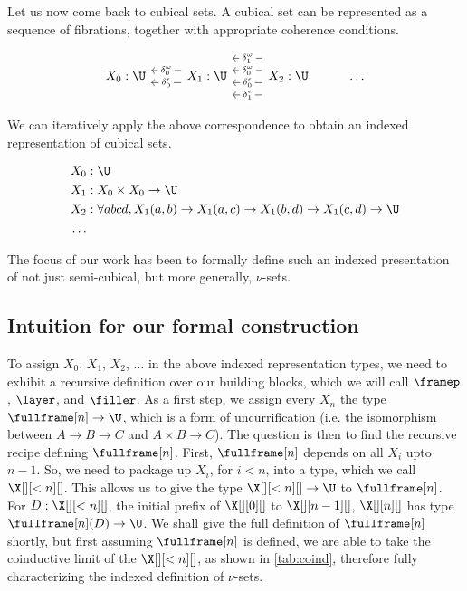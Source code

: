 \documentclass[10pt]{art.cls/art}
\begin{document}
Let us now come back to cubical sets. A cubical set can be represented as a sequence of fibrations, together with appropriate coherence conditions.

\begin{equation*}
  \begin{tikzcd}
    X_0 : \U & X_1 : \U \arrow[l, "\delta^\epsilon_0" description, shift left=2] \arrow[l, "\delta^\omega_0" description, shift right=2] & X_2 : \U \arrow[l, "\delta^\epsilon_1" description, shift left=6] \arrow[l, "\delta^\epsilon_0" description, shift left=2] \arrow[l, "\delta^\omega_0" description, shift right=2] \arrow[l, "\delta^\omega_1" description, shift right=6] & \ldots
  \end{tikzcd}
\end{equation*}

We can iteratively apply the above correspondence to obtain an indexed representation of cubical sets.

\begin{align*}
  X_0 & : \U                                                                                                              \\
  X_1 & : X_0 \times X_0 \rightarrow \U                                                                                   \\
  X_2 & : \forall a b c d, X_1 (a, b) \rightarrow X_1 (a, c) \rightarrow X_1 (b, d) \rightarrow X_1 (c, d) \rightarrow \U \\
  \ldots
\end{align*}

The focus of our work has been to formally define such an indexed presentation of not just semi-cubical, but more generally, $\nu$-sets.

\subsection{Intuition for our formal construction}
To assign $X_0$, $X_1$, $X_2$, $\ldots$ in the above indexed representation types, we need to exhibit a recursive definition over our building blocks, which we will call $\framep$, $\layer$, and $\filler$. As a first step, we assign every $X_n$ the type $\fullframe[n] \rightarrow \U$, which is a form of uncurrification (i.e. the isomorphism between $A \rightarrow B \rightarrow C$ and $A \times B \rightarrow C$). The question is then to find the recursive recipe defining $\fullframe[n]$. First, $\fullframe[n]$ depends on all $X_i$ upto $n - 1$. So, we need to package up $X_i$, for $i < n$, into a type, which we call $\X[][<n][]$. This allows us to give the type $\X[][<n][] \rightarrow \U$ to $\fullframe[n]$. For $D: \X[][<n][]$, the initial prefix of $\X[][0][]$ to $\X[][n - 1][]$, $\X[][n][]$ has type $\fullframe[n](D) \rightarrow \U$. We shall give the full definition of $\fullframe[n]$ shortly, but first assuming $\fullframe[n]$ is defined, we are able to take the coinductive limit of the $\X[][<n][]$, as shown in \ref{tab:coind}, therefore fully characterizing the indexed definition of $\nu$-sets.
\end{document}

